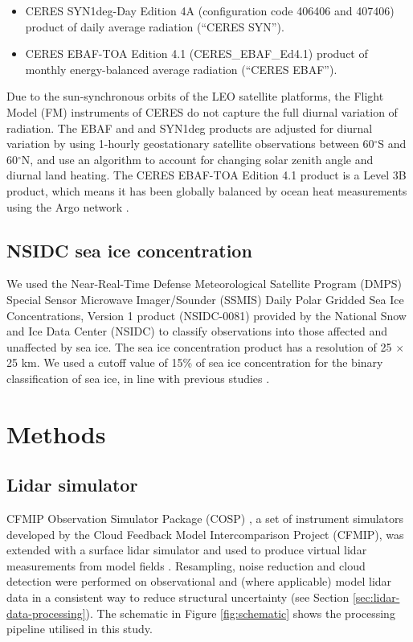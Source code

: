 \begin{itemize}
\item CERES SYN1deg-Day Edition 4A (configuration code 406406 and 407406)
product of daily average radiation (``CERES SYN'').
\item CERES EBAF-TOA Edition 4.1 (CERES\_EBAF\_Ed4.1)
product of monthly energy-balanced average radiation (``CERES EBAF'').
\end{itemize}

Due to the sun-synchronous orbits of the LEO satellite platforms, the Flight
Model (FM) instruments of CERES do not capture the full diurnal variation of
radiation. The EBAF and and SYN1deg products are adjusted for diurnal variation
by using 1-hourly geostationary satellite observations between 60$^\circ$S and
60$^\circ$N, and use an algorithm to account for changing solar zenith angle and
diurnal land heating. The CERES EBAF-TOA Edition 4.1 product is a Level 3B
product, which means it has been globally balanced by ocean heat measurements
using the Argo network \citep{roemmich2009}.

\subsection{NSIDC sea ice concentration}

We used the Near-Real-Time Defense Meteorological Satellite Program (DMPS)
Special Sensor Microwave Imager/Sounder (SSMIS) Daily Polar Gridded Sea Ice
Concentrations, Version 1 product (NSIDC-0081) \citep{maslanik1999} provided by
the National Snow and Ice Data Center (NSIDC) to classify observations into
those affected and unaffected by sea ice. The sea ice concentration product has
a resolution of 25 $\times$ 25 \unit{km}. We used a cutoff value of 15\% of sea
ice concentration for the binary classification of sea ice, in line with
previous studies \citep{comiso2008}.

\section{Methods}

\subsection{Lidar simulator}

CFMIP Observation Simulator Package (COSP) \citep{bodas-salcedo2011}, a set of
instrument simulators developed by the Cloud Feedback Model Intercomparison
Project (CFMIP), was extended with a surface lidar simulator and used to produce
virtual lidar measurements from model fields \citep{kuma2019}. Resampling, noise
reduction and cloud detection were performed on observational and (where
applicable) model lidar data in a consistent way to reduce structural
uncertainty (see Section \ref{sec:lidar-data-processing}). The schematic in
Figure \ref{fig:schematic} shows the processing pipeline utilised in this study.


